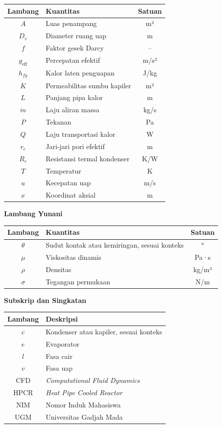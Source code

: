 \documentclass[
  12pt,
  12pt,a4paper,oneside]{report}
\begin{document}
\begin{longtable}[]{@{}clc@{}}
\toprule
Lambang & Kuantitas & Satuan \\
\midrule
\endhead
\(A\) & Luas penampang & m² \\
\(D_v\) & Diameter ruang uap & m \\
\(f\) & Faktor gesek Darcy & -- \\
\(g_{\mathrm{eff}}\) & Percepatan efektif & m/s² \\
\(h_{fg}\) & Kalor laten penguapan & J/kg \\
\(K\) & Permeabilitas sumbu kapiler & m² \\
\(L\) & Panjang pipa kalor & m \\
\(\dot m\) & Laju aliran massa & kg/s \\
\(P\) & Tekanan & Pa \\
\(Q\) & Laju transportasi kalor & W \\
\(r_c\) & Jari-jari pori efektif & m \\
\(R_c\) & Resistansi termal kondenser & K/W \\
\(T\) & Temperatur & K \\
\(u\) & Kecepatan uap & m/s \\
\(x\) & Koordinat aksial & m \\
\bottomrule
\end{longtable}

\textbf{Lambang Yunani}

\begin{longtable}[]{@{}clc@{}}
\toprule
Lambang & Kuantitas & Satuan \\
\midrule
\endhead
\(\theta\) & Sudut kontak atau kemiringan, sesuai konteks & ° \\
\(\mu\) & Viskositas dinamis & Pa·s \\
\(\rho\) & Densitas & kg/m³ \\
\(\sigma\) & Tegangan permukaan & N/m \\
\bottomrule
\end{longtable}

\textbf{Subskrip dan Singkatan}

\begin{longtable}[]{@{}cl@{}}
\toprule
Lambang & Deskripsi \\
\midrule
\endhead
\(c\) & Kondenser atau kapiler, sesuai konteks \\
\(e\) & Evaporator \\
\(l\) & Fasa cair \\
\(v\) & Fasa uap \\
CFD & \emph{Computational Fluid Dynamics} \\
HPCR & \emph{Heat Pipe Cooled Reactor} \\
NIM & Nomor Induk Mahasiswa \\
UGM & Universitas Gadjah Mada \\
\bottomrule
\end{longtable}
\end{document}
